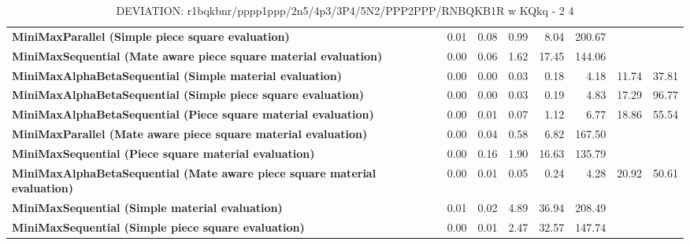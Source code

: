 \begin{table}[H]
{\begin{tabular}{|p{8cm}|*{7}{r|}}
\rowcolor[HTML]{FFFFFF}
\textbf{MiniMaxParallel (Simple piece square evaluation)}               & 0.01 & 0.08 & 0.99 & 8.04 & 200.67 &  &  \\

\rowcolor[HTML]{EFEFEF}
\textbf{MiniMaxSequential (Mate aware piece square material evaluation)}               & 0.00 & 0.06 & 1.62 & 17.45 & 144.06 &  &  \\

\rowcolor[HTML]{FFFFFF}
\textbf{MiniMaxAlphaBetaSequential (Simple material evaluation)}               & 0.00 & 0.00 & 0.03 & 0.18 & 4.18 & 11.74 & 37.81 \\

\rowcolor[HTML]{EFEFEF}
\textbf{MiniMaxAlphaBetaSequential (Simple piece square evaluation)}               & 0.00 & 0.00 & 0.03 & 0.19 & 4.83 & 17.29 & 96.77 \\

\rowcolor[HTML]{FFFFFF}
\textbf{MiniMaxAlphaBetaSequential (Piece square material evaluation)}               & 0.00 & 0.01 & 0.07 & 1.12 & 6.77 & 18.86 & 55.54 \\

\rowcolor[HTML]{EFEFEF}
\textbf{MiniMaxParallel (Mate aware piece square material evaluation)}               & 0.00 & 0.04 & 0.58 & 6.82 & 167.50 &  &  \\

\rowcolor[HTML]{FFFFFF}
\textbf{MiniMaxSequential (Piece square material evaluation)}               & 0.00 & 0.16 & 1.90 & 16.63 & 135.79 &  &  \\

\rowcolor[HTML]{EFEFEF}
\textbf{MiniMaxAlphaBetaSequential (Mate aware piece square material evaluation)}               & 0.00 & 0.01 & 0.05 & 0.24 & 4.28 & 20.92 & 50.61 \\

\rowcolor[HTML]{FFFFFF}
\textbf{MiniMaxSequential (Simple material evaluation)}               & 0.01 & 0.02 & 4.89 & 36.94 & 208.49 &  &  \\

\rowcolor[HTML]{EFEFEF}
\textbf{MiniMaxSequential (Simple piece square evaluation)}               & 0.00 & 0.01 & 2.47 & 32.57 & 147.74 &  &  \\

            \hline
        \end{tabular}%
    }
    \caption{DEVIATION: r1bqkbnr/pppp1ppp/2n5/4p3/3P4/5N2/PPP2PPP/RNBQKB1R w KQkq - 2 4}
    \label{tab:fork-opportunity-deviation}
\end{table}
